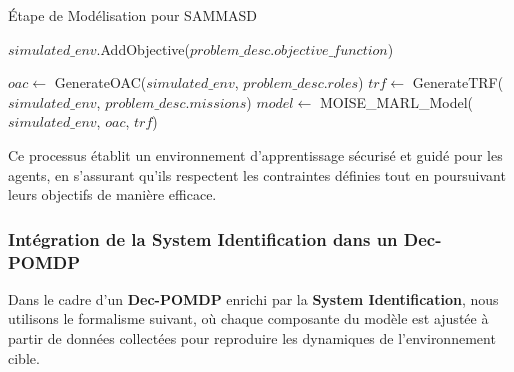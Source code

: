 \documentclass[sigconf,anonymous]{aamas}
\begin{document}
\begin{algorithm}[hbt!]
  \caption{Étape de Modélisation pour SAMMASD}\label{alg:modeling}

  \SetAlgoLined
{}


$simulated\_env$.AddObjective($problem\_desc.objective\_function$)\;

$oac \gets$ GenerateOAC($simulated\_env$, $problem\_desc.roles$)\;
$trf \gets$ GenerateTRF($simulated\_env$, $problem\_desc.missions$)\;
$model \gets$ MOISE\_MARL\_Model($simulated\_env$, $oac$, $trf$)\;


\end{algorithm}


Ce processus établit un environnement d'apprentissage sécurisé et guidé pour les agents, en s'assurant qu'ils respectent les contraintes définies tout en poursuivant leurs objectifs de manière efficace.


\subsubsection{Intégration de la System Identification dans un Dec-POMDP}

Dans le cadre d'un \textbf{Dec-POMDP} enrichi par la \textbf{System Identification}, nous utilisons le formalisme suivant, où chaque composante du modèle est ajustée à partir de données collectées pour reproduire les dynamiques de l'environnement cible. 
\end{document}
